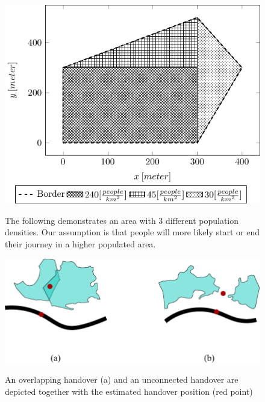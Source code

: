 \documentclass[twocolumn]{bmcart}%
\begin{document}
\begin{backmatter}
\begin{figure}[h!]
		\caption{ The following demonstrates an area with 3 different population densities. Our assumption is that people will more likely start or end their journey in a higher populated area.
		}
		\includegraphics[width=0.9\columnwidth]{populationgrid}
		\label{fig:populationgrid}
	\end{figure}
	\begin{figure}[h!]

		\caption{ An overlapping handover (a) and an unconnected handover are depicted together with the estimated handover position (red point)
		}
		\includegraphics[width=0.9\columnwidth]{handover}
				\label{fig:handover}
	\end{figure}
	
	\begin{figure}[h!]


\end{figure}
\end{backmatter}
\end{document}
